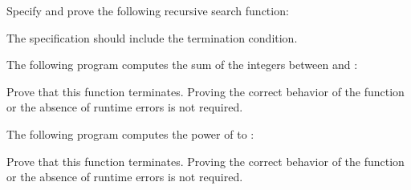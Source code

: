 Specify and prove the following recursive search function:




The specification should include the termination condition.






The following program computes the sum of the integers between 
and :




Prove that this function terminates. Proving the correct behavior of the
function or the absence of runtime errors is not required.






The following program computes the power of  to :




Prove that this function terminates. Proving the correct behavior of the
function or the absence of runtime errors is not required.


